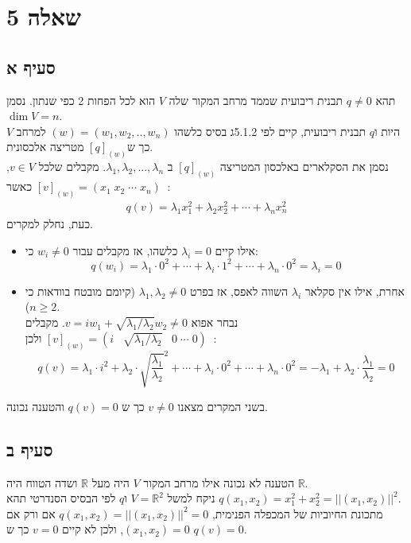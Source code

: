 \documentclass{article}
\def\reals{\mathbb{R}}
\DeclareMathOperator{\tra}{^t}
\begin{document}
\pagebreak

\section*{שאלה 5}

\subsection*{סעיף א}

תהא $q\ne 0$ תבנית ריבועית שממד מרחב המקור שלה $V$ הוא לכל הפחות 2 כפי שנתון. נסמן $\dim V=n$. \\
היות ו$q$ תבנית ריבועית, קיים לפי 5.1.2ג בסיס כלשהו $(w)=(w_1, w_2, .., w_n)$ למרחב $V$ כך ש$[q]_{(w)}$ מטריצה אלכסונית. \\
נסמן את הסקלארים באלכסון המטריצה $[q]_{(w)}$ ב $\lambda_1, \lambda_2, ..., \lambda_n$. מקבלים שלכל $v\in V$, כאשר $[v]_{(w)}=(x_1 \; x_2 \; \cdots \; x_n)\tra$:
\begin{align*}
    q(v)=\lambda_1x_1^2 + \lambda_2x_2^2+\cdots+\lambda_nx_n^2
\end{align*}
כעת, נחלק למקרים.
\begin{itemize}
    \item אילו קיים $\lambda_i=0$ כלשהו, אז מקבלים עבור $w_i\ne 0$ כי: \[
              q(w_i)=\lambda_1 \cdot 0^2 + \cdots + \lambda_i \cdot 1^2 + \cdots + \lambda_n \cdot 0^2 = \lambda_i=0
          \]
    \item אחרת, אילו אין סקלאר $\lambda_i$ השווה לאפס, אז בפרט $\lambda_1, \lambda_2\ne 0$ (קיומם מובטח בוודאות כי $n\geq 2$). \\
          נבחר אפוא $v=iw_1+\sqrt{\lambda_1/\lambda_2}w_2\ne 0$. מקבלים $[v]_{(w)}=(i \;\;\; \sqrt{\lambda_1/\lambda_2} \;\;\; 0 \; \cdots \; 0) \tra$ ולכן: \[
              q(v)=\lambda_1 \cdot i^2 + \lambda_2 \cdot \sqrt{\frac{\lambda_1}{\lambda_2}}^2 + \cdots + \lambda_i \cdot 0^2 + \cdots + \lambda_n \cdot 0^2 = -\lambda_1 + \lambda_2 \cdot \frac{\lambda_1}{\lambda_2}=0
          \]
\end{itemize}
בשני המקרים מצאנו $v\ne 0$ כך ש $q(v)=0$ והטענה נכונה.

\subsection*{סעיף ב}

הטענה לא נכונה אילו מרחב המקור $V$ היה מעל $\reals$ ושדה הטווח היה $\reals$. \\
ניקח למשל $V=\reals^2$ ו$q$ לפי הבסיס הסנדרטי תהא $q(x_1, x_2)=x_1^2+x_2^2=||(x_1, x_2)||^2$.\\
מתכונת החיוביות של המכפלה הפנימית, $q(x_1, x_2)=||(x_1, x_2)||^2=0$ אם ורק אם $(x_1, x_2)=0$, ולכן לא קיים $v=0$ כך ש $q(v)=0$.
\end{document}
